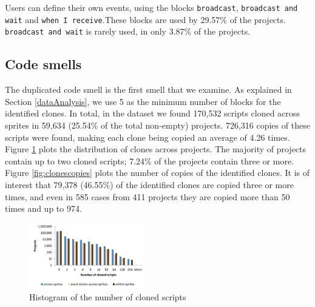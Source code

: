 \documentclass{sig-alternate}
\begin{document}
Users can define their own events, using the blocks \texttt{broadcast}, \texttt{broadcast and wait} and \texttt{when I receive}.These blocks are used by 29.57\% of the projects. \texttt{broadcast and wait} is rarely used, in only 3.87\% of the projects.

\noindent
{}


\subsection{Code smells}
\label{RQ3}
The duplicated code smell is the first smell that we examine. As explained in Section \ref{dataAnalysis}, we use 5 as the minimum number of blocks for the identified clones. In total, in the dataset we found 170,532 scripts cloned across sprites in 59,634 (25.54\% of the total non-empty) projects. 726,316 copies of these scripts were found, making each clone being copied an average of 4.26 times. Figure \ref{fig:clonesprojects} plots the distribution of clones across projects. The majority of projects contain up to two cloned scripts; 7.24\% of the projects contain three or more. Figure \ref{fig:clonescopies} plots the number of copies of the identified clones. It is of interest that 79,378 (46.55\%) of the identified clones are copied three or more times, and even in 585 cases from 411 projects they are copied more than 50 times and up to 974.\footnotemark[\ref{repo}]

\begin{figure}
	\centering
	\includegraphics[width=0.45\textwidth]{fig/charts/11clonesprojects}
	\caption{Histogram of the number of cloned scripts}
	\label{fig:clonesprojects}
\end{figure}
\end{document}
